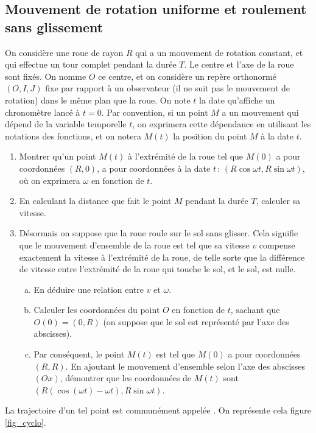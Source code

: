 	\subsection{Mouvement de rotation uniforme et roulement sans glissement}
		On considère une roue de rayon $R$ qui a un mouvement de rotation constant, et qui effectue un tour complet pendant la durée $T$. Le centre et l'axe de la roue sont fixés. On nomme $O$ ce centre, et on considère un repère orthonormé $(O,I,J)$ fixe par rapport à un observateur (il ne suit pas le mouvement de rotation) dans le même plan que la roue. On note $t$ la date qu'affiche un chronomètre lancé à $t=0$. Par convention, si un point $M$ a un mouvement qui dépend de la variable temporelle $t$, on exprimera cette dépendance en utilisant les notations des fonctions, et on notera $M(t)$ la position du point $M$ à la date $t$.
		\begin{enumerate}
			\item Montrer qu'un point $M(t)$ à l'extrémité de la roue tel que $M(0)$ a pour coordonnées $(R,0)$, a pour coordonnées à la date $t$\,: $(R\cos\omega t, R\sin\omega t)$, où on exprimera $\omega$ en fonction de $t$.
			\item En calculant la distance que fait le point $M$ pendant la durée $T$, calculer sa vitesse.
			\item Désormais on suppose que la roue roule sur le sol sans glisser. Cela signifie que le mouvement d'ensemble de la roue est tel que sa vitesse $v$ compense exactement la vitesse à l'extrémité de la roue, de telle sorte que la différence de vitesse entre l'extrémité de la roue qui touche le sol, et le sol, est nulle.
			\begin{enumerate}[a.]
			 	\item En déduire une relation entre $v$ et $\omega$.
			 	\item Calculer les coordonnées du point $O$ en fonction de $t$, sachant que $O(0)=(0,R)$ (on suppose que le sol est représenté par l'axe des abscisses).
			 	\item Par conséquent, le point $M(t)$ est tel que $M(0)$ a pour coordonnées $(R,R)$. En ajoutant le mouvement d'ensemble selon l'axe des abscisses $(Ox)$, démontrer que les coordonnées de $M(t)$ sont $(R(\cos(\omega t)-\omega t), R\sin \omega t)$.
			\end{enumerate} 
		\end{enumerate}
		La trajectoire d'un tel point est communément appelée . On représente cela figure \ref{fig_cyclo}.


